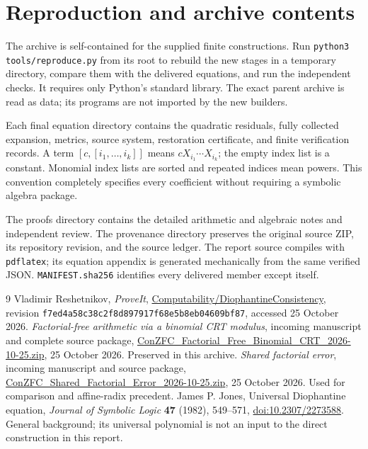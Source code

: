 \documentclass[11pt]{article}
\newcommand{\file}[1]{\nolinkurl{#1}}
\theoremstyle{remark}\newtheorem{remark}[theorem]{Remark}
\begin{document}
\section{Reproduction and archive contents}

The archive is self-contained for the supplied finite constructions.
Run \file{python3 tools/reproduce.py} from its root to rebuild the
new stages in a temporary directory, compare them with the delivered
equations, and run the independent checks. It requires only Python's
standard library. The exact parent archive is read as data; its
programs are not imported by the new builders.

Each final equation directory contains the quadratic residuals,
fully collected expansion, metrics, source system, restoration
certificate, and finite verification records. A term $[c,[i_1,\ldots,i_k]]$
means $cX_{i_1}\cdots X_{i_k}$; the empty index list is a constant.
Monomial index lists are sorted and repeated indices mean powers.
This convention completely specifies every coefficient without
requiring a symbolic algebra package.

The proofs directory contains the detailed arithmetic and algebraic
notes and independent review. The provenance directory preserves
the original source ZIP, its repository revision, and the source
ledger. The report source compiles with \file{pdflatex}; its equation
appendix is generated mechanically from the same verified JSON.
\file{MANIFEST.sha256} identifies every delivered member except itself.

\begin{thebibliography}{9}
 Vladimir Reshetnikov, \emph{ProveIt},
\href{https://github.com/VladimirReshetnikov/ProveIt/tree/f7ed4a58c38c2f8d897917f68e5b8eb04609bf87/Computability/DiophantineConsistency}{Computability/DiophantineConsistency},
revision \file{f7ed4a58c38c2f8d897917f68e5b8eb04609bf87}, accessed
25 October 2026.
 \emph{Factorial-free arithmetic via a binomial
CRT modulus}, incoming manuscript and complete source package,
\href{https://github.com/VladimirReshetnikov/ProveIt/blob/f7ed4a58c38c2f8d897917f68e5b8eb04609bf87/docs/incoming/ConZFC_Factorial_Free_Binomial_CRT_2026-10-25.zip}{ConZFC\_Factorial\_Free\_Binomial\_CRT\_2026-10-25.zip},
25 October 2026. Preserved in this archive.
 \emph{Shared factorial error}, incoming manuscript
and source package,
\href{https://github.com/VladimirReshetnikov/ProveIt/blob/f7ed4a58c38c2f8d897917f68e5b8eb04609bf87/docs/incoming/ConZFC_Shared_Factorial_Error_2026-10-25.zip}{ConZFC\_Shared\_Factorial\_Error\_2026-10-25.zip},
25 October 2026. Used for comparison and affine-radix precedent.
 James P. Jones, Universal Diophantine equation,
\emph{Journal of Symbolic Logic} \textbf{47} (1982), 549--571,
\href{https://doi.org/10.2307/2273588}{doi:10.2307/2273588}.
General background; its universal polynomial is not an input to
the direct construction in this report.
\end{thebibliography}
\end{document}
